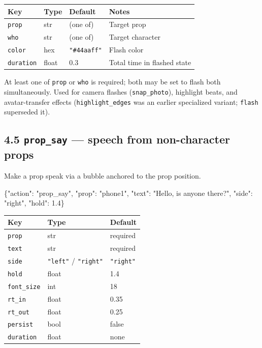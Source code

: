 \documentclass[
  11pt,
]{book}
\newenvironment{Shaded}{}{}
\newcommand{\DataTypeTok}[1]{\textcolor[rgb]{0.56,0.13,0.00}{#1}}
\newcommand{\FloatTok}[1]{\textcolor[rgb]{0.25,0.63,0.44}{#1}}
\newcommand{\FunctionTok}[1]{\textcolor[rgb]{0.02,0.16,0.49}{#1}}
\newcommand{\StringTok}[1]{\textcolor[rgb]{0.25,0.44,0.63}{#1}}
\begin{document}
\begin{longtable}[]{@{}llll@{}}
\toprule\noalign{}
Key & Type & Default & Notes \\
\midrule\noalign{}
\endhead
\bottomrule\noalign{}
\endlastfoot
\texttt{prop} & str & (one of) & Target prop \\
\texttt{who} & str & (one of) & Target character \\
\texttt{color} & hex & \texttt{"\#44aaff"} & Flash color \\
\texttt{duration} & float & 0.3 & Total time in flashed state \\
\end{longtable}

At least one of \texttt{prop} or \texttt{who} is required; both may be
set to flash both simultaneously. Used for camera flashes
(\texttt{snap\_photo}), highlight beats, and avatar-transfer effects
(\texttt{highlight\_edges} was an earlier specialized variant;
\texttt{flash} superseded it).

\subsection{\texorpdfstring{4.5 \texttt{prop\_say} --- speech from
non-character
props}{4.5 prop\_say --- speech from non-character props}}\label{prop_say-speech-from-non-character-props}

Make a prop speak via a bubble anchored to the prop position.

\begin{Shaded}
\begin{Highlighting}[]
\FunctionTok{\{}\DataTypeTok{"action"}\FunctionTok{:} \StringTok{"prop\_say"}\FunctionTok{,} \DataTypeTok{"prop"}\FunctionTok{:} \StringTok{"phone1"}\FunctionTok{,}
 \DataTypeTok{"text"}\FunctionTok{:} \StringTok{"Hello, is anyone there?"}\FunctionTok{,}
 \DataTypeTok{"side"}\FunctionTok{:} \StringTok{"right"}\FunctionTok{,} \DataTypeTok{"hold"}\FunctionTok{:} \FloatTok{1.4}\FunctionTok{\}}
\end{Highlighting}
\end{Shaded}

\begin{longtable}[]{@{}lll@{}}
\toprule\noalign{}
Key & Type & Default \\
\midrule\noalign{}
\endhead
\bottomrule\noalign{}
\endlastfoot
\texttt{prop} & str & required \\
\texttt{text} & str & required \\
\texttt{side} & \texttt{"left"} / \texttt{"right"} & \texttt{"right"} \\
\texttt{hold} & float & 1.4 \\
\texttt{font\_size} & int & 18 \\
\texttt{rt\_in} & float & 0.35 \\
\texttt{rt\_out} & float & 0.25 \\
\texttt{persist} & bool & false \\
\texttt{duration} & float & none \\
\end{longtable}
\end{document}
